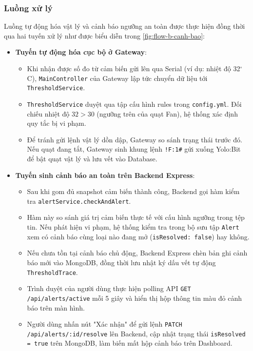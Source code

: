 \subsubsection{Luồng xử lý}
Luồng tự động hóa vật lý và cảnh báo ngưỡng an toàn được thực hiện đồng thời qua hai tuyến xử lý như được biểu diễn trong \autoref{fig:flow-b-canh-bao}:
\begin{itemize}
    \item \textbf{Tuyến tự động hóa cục bộ ở Gateway}:
        \begin{itemize}
            \item Khi nhận được số đo từ cảm biến gửi lên qua Serial (ví dụ: nhiệt độ 32$^\circ$C), \texttt{MainController} của Gateway lập tức chuyển dữ liệu tới \texttt{ThresholdService}.
            \item \texttt{ThresholdService} duyệt qua tập cấu hình rules trong \texttt{config.yml}. Đối chiếu nhiệt độ $32 > 30$ (ngưỡng trên của quạt Fan), hệ thống xác định quy tắc bị vi phạm.
            \item Để tránh gửi lệnh vật lý dồn dập, Gateway so sánh trạng thái trước đó. Nếu quạt đang tắt, Gateway sinh khung lệnh \texttt{!F:1\#} gửi xuống Yolo:Bit để bật quạt vật lý và lưu vết vào Database.
        \end{itemize}
    \item \textbf{Tuyến sinh cảnh báo an toàn trên Backend Express}:
        \begin{itemize}
            \item Sau khi gom đủ snapshot cảm biến thành công, Backend gọi hàm kiểm tra \texttt{alertService.checkAndAlert}.
            \item Hàm này so sánh giá trị cảm biến thực tế với cấu hình ngưỡng trong tệp tin. Nếu phát hiện vi phạm, hệ thống kiểm tra trong bộ sưu tập \texttt{Alert} xem có cảnh báo cùng loại nào đang mở (\texttt{isResolved: false}) hay không.
            \item Nếu chưa tồn tại cảnh báo chủ động, Backend Express chèn bản ghi cảnh báo mới vào MongoDB, đồng thời lưu nhật ký dấu vết tự động \texttt{ThresholdTrace}.
            \item Trình duyệt của người dùng thực hiện polling API \texttt{GET /api/alerts/active} mỗi 5 giây và hiển thị hộp thông tin màu đỏ cảnh báo trên màn hình.
            \item Người dùng nhấn nút "Xác nhận" để gửi lệnh \texttt{PATCH /api/alerts/:id/resolve} lên Backend, cập nhật trạng thái \texttt{isResolved = true} trên MongoDB, làm biến mất hộp cảnh báo trên Dashboard.
        \end{itemize}
\end{itemize}

